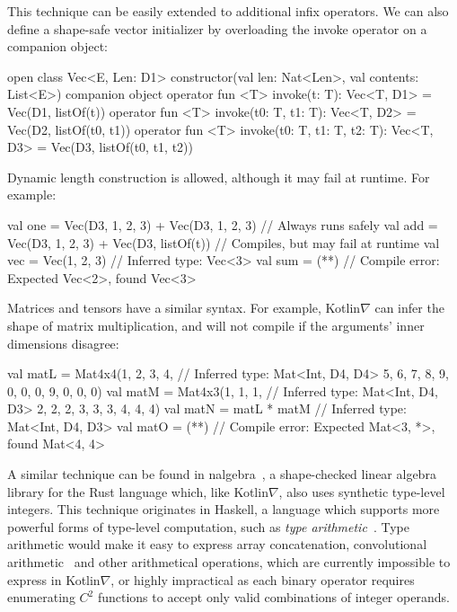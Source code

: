 \documentclass[12pt,initial,twoside,maitrise]{dms}
\makeatletter
\def\uwave{\bgroup \markoverwith{\lower3.5\p@\hbox{\sixly \textcolor{red}{\char58}}}\ULon}
\numberwithin{equation}{section}
\numberwithin{table}{chapter}
\numberwithin{figure}{chapter}
\makeatother
\begin{document}
%
This technique can be easily extended to additional infix operators. We can also define a shape-safe vector initializer by overloading the invoke operator on a companion object:
%
\begin{kotlinlisting}
open class Vec<E, Len: D1> constructor(val len: Nat<Len>, val contents: List<E>) {
  companion object {
    operator fun <T> invoke(t: T): Vec<T, D1> = Vec(D1, listOf(t))
    operator fun <T> invoke(t0: T, t1: T): Vec<T, D2> = Vec(D2, listOf(t0, t1))
    operator fun <T> invoke(t0: T, t1: T, t2: T): Vec<T, D3> = Vec(D3, listOf(t0, t1, t2))
  }
}
\end{kotlinlisting}
%
Dynamic length construction is allowed, although it may fail at runtime. For example:
%
\begin{kotlinlisting}
val one = Vec(D3, 1, 2, 3) + Vec(D3, 1, 2, 3)   // Always runs safely
val add = Vec(D3, 1, 2, 3) + Vec(D3, listOf(t)) // Compiles, but may fail at runtime
val vec = Vec(1, 2, 3) // Inferred type: Vec<3>
val sum = (*\uwave{Vec(D2, 1, 2) + add}*) // Compile error: Expected Vec<2>, found Vec<3>
\end{kotlinlisting}
%
Matrices and tensors have a similar syntax. For example, Kotlin$\nabla$ can infer the shape of matrix multiplication, and will not compile if the arguments' inner dimensions disagree:
%
\begin{kotlinlisting}
val matL = Mat4x4(1, 2, 3, 4, // Inferred type: Mat<Int, D4, D4>
                  5, 6, 7, 8,
                  9, 0, 0, 0,
                  9, 0, 0, 0)
val matM = Mat4x3(1, 1, 1, // Inferred type: Mat<Int, D4, D3>
                  2, 2, 2,
                  3, 3, 3,
                  4, 4, 4)
val matN = matL * matM // Inferred type: Mat<Int, D4, D3>
val matO = (*\uwave{matM *\ matM}*) // Compile error: Expected Mat<3, *>, found Mat<4, 4>
\end{kotlinlisting}
%
A similar technique can be found in nalgebra~\citep{crozet2019nalgebra}, a shape-checked linear algebra library for the Rust language which, like Kotlin$\nabla$, also uses synthetic type-level integers. This technique originates in Haskell, a language which supports more powerful forms of type-level computation, such as \textit{type arithmetic}~\citep{kiselyov2005number}. Type arithmetic would make it easy to express array concatenation, convolutional arithmetic~\citep{dumoulin2016guide} and other arithmetical operations, which are currently impossible to express in Kotlin$\nabla$, or highly impractical as each binary operator requires enumerating $C^2$ functions to accept only valid combinations of integer operands.
\end{document}
